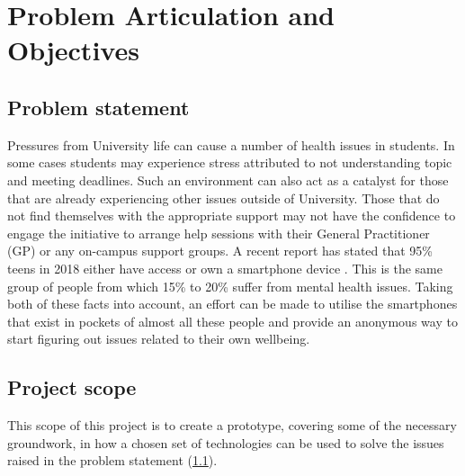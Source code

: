 \section{Problem Articulation and Objectives}

\subsection{Problem statement} \label{problemstatement}

Pressures from University life can cause a number of health issues in students.
In some cases students may experience stress attributed to not understanding topic and meeting deadlines.
Such an environment can also act as a catalyst for those that are already experiencing other issues outside of University.
Those that do not find themselves with the appropriate support may not have the confidence to engage the initiative to arrange help sessions 
with their General Practitioner (GP) or any on-campus support groups. 
A recent report has stated that 95\% teens in 2018 either have access or own a smartphone device \cite{monicajing2018teenstechnology}.
This is the same group of people from which 15\% to 20\% suffer from mental health issues.
Taking both of these facts into account, an effort can be made to utilise the smartphones that exist in pockets of almost all these people 
and provide an anonymous way to start figuring out issues related to their own wellbeing.


\subsection{Project scope}
This scope of this project is to create a prototype, covering some of the necessary groundwork, in how a chosen set of technologies can be used 
to solve the issues raised in the problem statement (\ref{problemstatement}).

